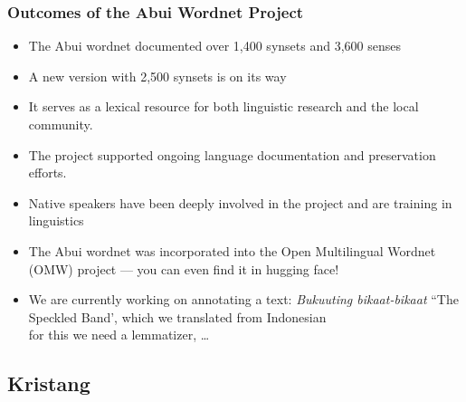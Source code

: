 \documentclass[xetex]{beamer}  %
\begin{document}
\begin{frame}
\frametitle{Outcomes of the Abui Wordnet Project}

\begin{itemize}
    \item The Abui wordnet documented over 1,400 synsets and 3,600 senses
    \item A new version with 2,500 synsets is on its way
    \item It serves as a lexical resource for both linguistic research and the local community.
    \item The project supported ongoing language documentation and preservation efforts.
    \item Native speakers have been deeply involved in the project and are training in linguistics
    \item The Abui wordnet was incorporated into the Open Multilingual Wordnet (OMW) project --- you can even find it in hugging face!


    \item We are currently working on annotating a text: \textit{Bukuuting bikaat-bikaat} ``The Speckled Band', which we translated from Indonesian
\\ for this we need a lemmatizer, \ldots
\end{itemize}
\end{frame}

\subsection{Kristang}
\end{document}
